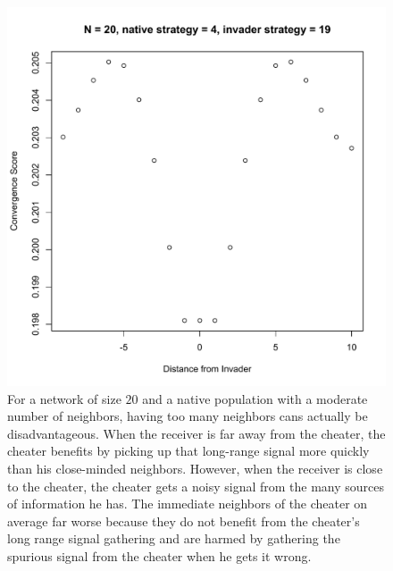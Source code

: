 \documentclass{article}
\begin{document}
\begin{figure}
\begin{center}
\includegraphics[scale=.5]{how_invader_succeeds.pdf}
\end{center}
\caption{For a network of size $20$ and a native population with a moderate number of neighbors, having too many neighbors cans actually be disadvantageous.  When the receiver is far away from the cheater, the cheater benefits by picking up that long-range signal more quickly than his close-minded neighbors.  However, when the receiver is close to the cheater, the cheater gets a noisy signal from the many sources of information he has.  The immediate neighbors of the cheater on average far worse because they do not benefit from the cheater's long range signal gathering and are harmed by gathering the spurious signal from the cheater when he gets it wrong.}
\label{convergence_in_space}
\end{figure}
\end{document}
